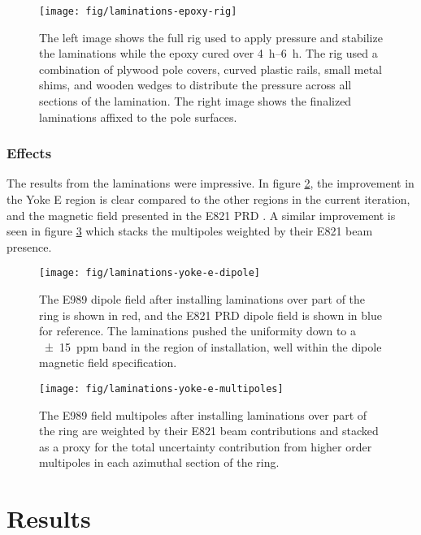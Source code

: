 \begin{figure}
\texttt{[image: fig/laminations-epoxy-rig]}
\caption{
    The left image shows the full rig used to apply pressure and stabilize the laminations while the epoxy cured over \SIrange{4}{6}{\hour}.  The rig used a combination of plywood pole covers, curved plastic rails, small metal shims, and wooden wedges to distribute the pressure across all sections of the lamination.  The right image shows the finalized laminations affixed to the pole surfaces.
    \label{fig:laminations-epoxy-rig}
}
\end{figure}

\subsubsection{Effects}

The results from the laminations were impressive.  In figure \ref{fig:laminations-yoke-e-dipole}, the improvement in the Yoke E region is clear compared to the other regions in the current iteration, and the magnetic field presented in the E821 PRD \cite{e821-prd}.  A similar improvement is seen in figure \ref{fig:laminations-yoke-e-multipoles} which stacks the multipoles weighted by their E821 beam presence.

\begin{figure}
\centering
\texttt{[image: fig/laminations-yoke-e-dipole]}
\caption{
    The E989 dipole field after installing laminations over part of the ring is shown in red, and the E821 PRD dipole field is shown in blue for reference.  The laminations pushed the uniformity down to a \SI{\pm15}{ppm} band in the region of installation, well within the dipole magnetic field specification.
    \label{fig:laminations-yoke-e-dipole}
}
\end{figure}

\begin{figure}
\centering
\texttt{[image: fig/laminations-yoke-e-multipoles]}
\caption{
    The E989 field multipoles after installing laminations over part of the ring are weighted by their E821 beam contributions and stacked as a proxy for the total uncertainty contribution from higher order multipoles in each azimuthal section of the ring. 
    \label{fig:laminations-yoke-e-multipoles}
}
\end{figure}

\section{Results}

